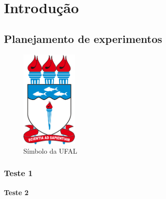 \chapter{Introdução}
\label{chap:Exemlos}

\section{Planejamento de experimentos}
\label{sec:Exemplo de imagem}

\begin{figure}[!hbt]
	\centering
	\caption{Símbolo da UFAL}
	\label{fig:1_possuem_celular}
	\includegraphics[width=0.25\textwidth]{imagens/ufal}
	
\end{figure}


\subsection{Teste 1}

\subsubsection{Teste 2}